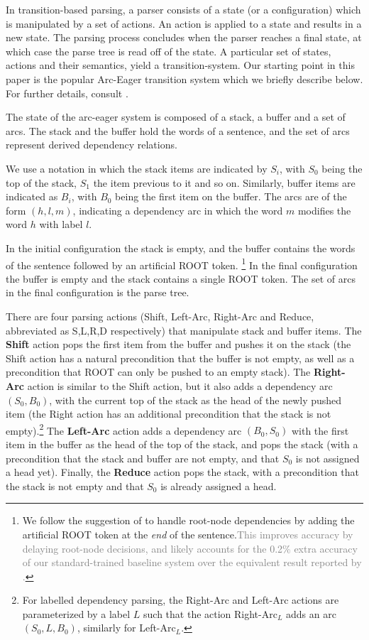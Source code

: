 \documentclass[11pt,letterpaper]{article}
\newcommand{\maybe}[1]{\textcolor{gray}{#1}}
\begin{document}
In transition-based parsing, a parser consists of a state (or a
configuration) which is manipulated by a set of actions.  An action is
applied to a state and results in a new state.  The parsing process
concludes when the parser reaches a final state, at which case the
parse tree is read off of the state.  A particular set of states,
actions and their semantics, yield a transition-system. Our starting
point in this paper is the popular Arc-Eager transition system which
we briefly describe below.  For further details, consult
\citep{nivre:04,nivre:cl}.

The state of the arc-eager system is composed of a
stack, a buffer and a set of arcs.
The stack and the buffer hold the words of a sentence,
and the set of arcs represent derived dependency relations.

We use a notation in which the stack items are indicated by $S_i$,
with $S_0$ being the top of the stack, $S_1$ the item previous to it
and so on.  Similarly, buffer items are indicated as $B_i$, with
$B_0$ being the first item on the buffer.  The arcs are of the form
$(h,l,m)$, indicating a dependency arc in which the word $m$ modifies
the word $h$ with label $l$.

In the initial configuration the stack is empty, and the buffer
contains the words of the sentence followed by an
artificial ROOT token.
\footnote{We follow the suggestion of \citet{nivre:squib} to handle root-node dependencies by
adding the artificial ROOT token at the \emph{end} of the sentence.\maybe{This improves
accuracy by delaying root-node decisions, and likely accounts for the 0.2\%
extra accuracy of our standard-trained baseline system over the equivalent
result reported by \citet{goldberg:12}.}}
In the final configuration the buffer is empty and the stack contains
a single ROOT token. The set of arcs in the final configuration is the
parse tree.

There are four parsing actions (Shift, Left-Arc, Right-Arc and Reduce,
abbreviated as S,L,R,D respectively) that
manipulate stack and buffer items.  The \textbf{Shift} action pops the
first item from the buffer and pushes it on the stack (the Shift
action has a natural precondition that the buffer is not empty, as well as a
precondition that ROOT can only be pushed to an empty stack).  The
\textbf{Right-Arc} action is similar to the Shift action, but it also adds
a dependency arc $(S_0, B_0)$,
with the current top of the stack as the head of the newly pushed item
(the Right action has an additional precondition that the stack is not
empty).\footnote{%
For labelled dependency parsing, the Right-Arc and Left-Arc actions are
parameterized by a label $L$ such that the action Right-Arc$_L$ adds an
arc $(S_0, L, B_0)$, similarly for Left-Arc$_L$.}
The \textbf{Left-Arc} action adds a dependency arc $(B_0, S_0)$ with the
first item in the buffer as the head of the top of the stack, and pops
the stack (with a precondition that the stack and buffer are not
empty, and that $S_0$ is not assigned a head yet). Finally, the
\textbf{Reduce} action pops the stack, with a precondition that the
stack is not empty and that $S_0$ is already assigned a head.
\end{document}
